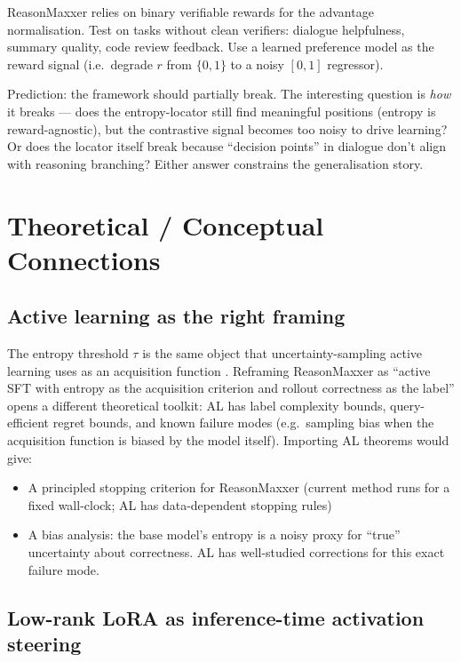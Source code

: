 \documentclass[11pt]{article}
\begin{document}
ReasonMaxxer relies on binary verifiable rewards for the advantage normalisation. Test on tasks without clean verifiers: dialogue helpfulness, summary quality, code review feedback. Use a learned preference model as the reward signal (i.e.\ degrade $r$ from $\{0,1\}$ to a noisy $[0,1]$ regressor).

Prediction: the framework should partially break. The interesting question is \emph{how} it breaks --- does the entropy-locator still find meaningful positions (entropy is reward-agnostic), but the contrastive signal becomes too noisy to drive learning? Or does the locator itself break because ``decision points'' in dialogue don't align with reasoning branching? Either answer constrains the generalisation story.

\section*{Theoretical / Conceptual Connections}

\subsection*{Active learning as the right framing}

The entropy threshold $\tau$ is the same object that uncertainty-sampling active learning uses as an acquisition function \citep{lewis1994sequential}. Reframing ReasonMaxxer as ``active SFT with entropy as the acquisition criterion and rollout correctness as the label'' opens a different theoretical toolkit: AL has label complexity bounds, query-efficient regret bounds, and known failure modes (e.g.\ sampling bias when the acquisition function is biased by the model itself). Importing AL theorems would give:

\begin{itemize}
  \item A principled stopping criterion for ReasonMaxxer (current method runs for a fixed wall-clock; AL has data-dependent stopping rules)
  \item A bias analysis: the base model's entropy is a noisy proxy for ``true'' uncertainty about correctness. AL has well-studied corrections for this exact failure mode.
\end{itemize}

\subsection*{Low-rank LoRA as inference-time activation steering}
\end{document}
